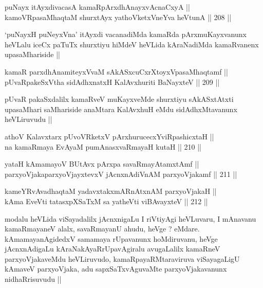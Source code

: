 \begin{shl}
puNayx itAyxdivacasA kamaRpArxdhAnayxvAcnaCxyA || \\
kamoVRpasaMhaqtaM shurxtAyx yathoVketxVneYva heVtunA ||  208 ||  
\end{shl}

\begin{artha}
`puNayxH puNeyxVna' itAyxdi vacanadiMda kamaRda pArxmuKayxvanunx
  heVLalu iceCx paTuTx shurxtiyu hiMdeV heVLida kAraNadiMda
  kamaRvanenx upasaMhariside ||
\end{artha}

\begin{shl}
kamaR parxdhAnamiteyxVvaM sAkASxcuCxrXtoyxVpasaMhaqtamf || \\
pUvaRpakeSxV\s tha sidAdhxnatxH KalAvxhuriti BaNayxteV ||  209 ||  
\end{shl}

\begin{artha}
pUvaR pakaSxdalilx kamaRveV muKayxveMde shurxtiyu sAkASxtAtxti
upasaMhari saMhariside anaMtara KalAvxhuH eMdu sidAdhxMtavanunx
heVLiruvudu ||
\end{artha}


\begin{shl}
athoV Kalavxtarx pUvoVRketxV pArxhurucecxYviRpashicxtaH || \\
na kamaRmaya EvAyaM pumAnasxvaRmayaH kutaH ||  210 ||  
\end{shl}
				
\begin{shl}
yataH kAmamayoV BUtAvx pArxpa savaRmayAtamxtAmf || \\
parxyoVjakaparxyoVjayxtevxV jAcnxnAdiVnAM parxyoVjakamf ||  211 ||  
\end{shl}
				
\begin{shl}
kameYRvAvadhaqtaM yadavxtakxmARnAtxnAM parxyoVjakaH || \\
kAma EveVti tatasxpXSaTxM sa yatheVti viBAvayxteV ||  212 ||  
\end{shl}

\begin{artha}
modalu heVLida viSayadalilx jAcnxnigaLu I riVtiyAgi heVLuvaru, I
mAnavanu kamaRmayaneV alalx, savaRmayanU ahudu, heVge ?
eMdare. kAmamayanAgidedxV samamaya rUpavanunx hoMdiruvanu, heVge
jAcnxnAdigaLu kAraNakAyaRrUpavAgiralu avugaLalilx kamaRneV
parxyoVjakaveMdu heVLiruvudo, kamaRpayaRMtaraviruva viSayagaLigU
kAmaveV parxyoVjaka, adu sapxSaTxvAguvaMte parxyoVjakavanunx
nidhaRrisuvudu ||
\end{artha}

